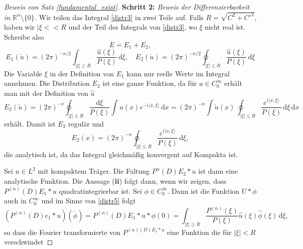 \begin{proof}[Beweis von Satz \ref{fundamental_exist}]
\textbf{Schritt 2:} \emph{Beweis der Differenzierbarkeit in $\mathbb R^n\setminus\{0\}$.}
Wir teilen das Integral \eqref{distr3} in zwei Teile auf. Falls $R=\sqrt{C^2 + C'^2}$, haben wir $|\xi<<R$ und der Teil des Integrals von \eqref{distr3}, wo $\xi$ nicht real ist. Schreibe also 
\begin{equation}\label{distr4}
E=E_1 + E_2,
\end{equation}
\begin{equation}\label{distr5}
E_1(\check u) = (2\pi)^{-n/2} \int_{|\xi|\ge R} \frac{\hat u(\xi)}{P(\xi)}\, \mathrm d\xi, \quad E_2(\check u)= (2\pi)^{-n/2} \oint_{|\xi|\le R} \frac{\hat u(\xi)}{P(\xi)}\, \mathrm d\xi
\end{equation}
Die Variable $\xi$ in der Definition von $E_1$ kann nur reelle Werte im Integral annehmen. Die Distribution $E_2$ ist eine ganze Funktion, da für $u\in C_0^\infty$ erhält man mit der Definition von $\hat u$
\begin{equation}
E_2(\check u) = (2\pi)^{-\nu} \oint_{|\xi |\le R} \frac{\mathrm d\xi}{P(\xi)} \int u(x) e^{-i\langle x,\xi\rangle}\, \mathrm dx= (2\pi)^{-n} \int \check u(x) \, \oint_{|\xi|\le R} \frac{e^{i\langle x, \xi\rangle}}{P(\xi)}\, \mathrm d\xi \, \mathrm dx
\end{equation}
erhält. Damit ist $E_2$ regulär und
\begin{equation}
E_2(x) = (2\pi)^{-n} \oint_{|\xi|\le R} \frac{e^{i\langle x, \xi\rangle}}{P(\xi)}\, \mathrm d\xi,
\end{equation}
die analytisch ist, da das Integral gleichmäßig konvergent auf Kompakta ist. 

Sei $u\in L^2$ mit kompaktem Träger. Die Faltung $P^{\alpha}(D)E_2 *u$ ist dann eine analytische Funktion.  Die Aussage ({\bf ii}) folgt dann, wenn wir zeigen, dass $P^{(\alpha)}(D) E_1 * u$ quadratintegrierbar ist.  Sei $\phi \in C_0^\infty$. Dann ist die Funktion $U*\phi$ auch in $C_0^\infty$ und im Sinne von \eqref{distr5} folgt
\begin{equation}
(P^{(\alpha)} (D) e_1 * u) (\check \phi) = P^{(\alpha)}(D) E_1 * u * \phi(0) = \int_{|\xi| \ge R} \frac{P^{(\alpha)}(\xi)}{P(\xi)} \hat u(\xi) \hat \phi(\xi) \, \mathrm d\xi,
\end{equation}     
so dass die Fourier transformierte von $P^{(\alpha)(D) E_1 * u}$ eine Funktion die für $|\xi|<R$ verschwindet 
\end{proof}
